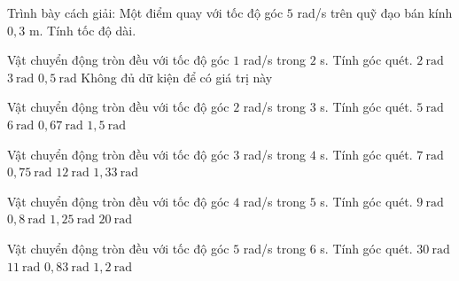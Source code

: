 \begin{bt}
Trình bày cách giải: Một điểm quay với tốc độ góc $5$ rad/s trên quỹ đạo bán kính $0,3$ m. Tính tốc độ dài.
\end{bt}

\begin{ex}
Vật chuyển động tròn đều với tốc độ góc $1$ rad/s trong $2$ s. Tính góc quét.
\choice
{\True $2\ \mathrm{rad}$}
{$3\ \mathrm{rad}$}
{$0,5\ \mathrm{rad}$}
{Không đủ dữ kiện để có giá trị này}
\end{ex}

\begin{ex}
Vật chuyển động tròn đều với tốc độ góc $2$ rad/s trong $3$ s. Tính góc quét.
\choice
{$5\ \mathrm{rad}$}
{\True $6\ \mathrm{rad}$}
{$0,67\ \mathrm{rad}$}
{$1,5\ \mathrm{rad}$}
\end{ex}

\begin{ex}
Vật chuyển động tròn đều với tốc độ góc $3$ rad/s trong $4$ s. Tính góc quét.
\choice
{$7\ \mathrm{rad}$}
{$0,75\ \mathrm{rad}$}
{\True $12\ \mathrm{rad}$}
{$1,33\ \mathrm{rad}$}
\end{ex}

\begin{ex}
Vật chuyển động tròn đều với tốc độ góc $4$ rad/s trong $5$ s. Tính góc quét.
\choice
{$9\ \mathrm{rad}$}
{$0,8\ \mathrm{rad}$}
{$1,25\ \mathrm{rad}$}
{\True $20\ \mathrm{rad}$}
\end{ex}

\begin{ex}
Vật chuyển động tròn đều với tốc độ góc $5$ rad/s trong $6$ s. Tính góc quét.
\choice
{\True $30\ \mathrm{rad}$}
{$11\ \mathrm{rad}$}
{$0,83\ \mathrm{rad}$}
{$1,2\ \mathrm{rad}$}
\end{ex}

